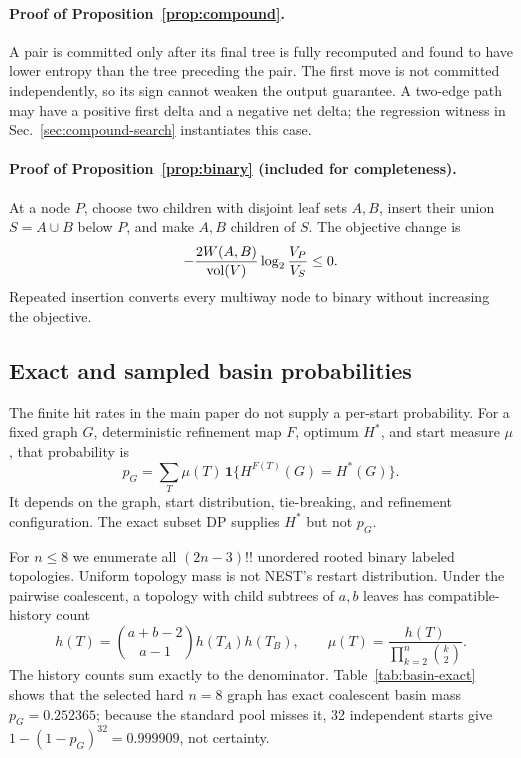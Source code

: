 \paragraph{Proof of Proposition~\ref{prop:compound}.}
A pair is committed only after its final tree is fully recomputed and found to
have lower entropy than the tree preceding the pair. The first move is not
committed independently, so its sign cannot weaken the output guarantee. A
two-edge path may have a positive first delta and a negative net delta; the
regression witness in Sec.~\ref{sec:compound-search} instantiates this case.

\paragraph{Proof of Proposition~\ref{prop:binary} (included for completeness).}
At a node $P$, choose two children with disjoint leaf sets $A,B$, insert their
union $S=A\cup B$ below $P$, and make $A,B$ children of $S$. The objective
change is
\[
 -\frac{2W(A,B)}{\operatorname{vol}(V)}\log_2\frac{V_P}{V_S}\le 0.
\]
Repeated insertion converts every multiway node to binary without increasing
the objective.

\subsection{Exact and sampled basin probabilities}\label{app:basin}
The finite hit rates in the main paper do not supply a per-start probability.
For a fixed graph $G$, deterministic refinement map $F$, optimum $H^*$, and
start measure $\mu$, that probability is
\[
 p_G=\sum_T \mu(T)\,\mathbf{1}\{H^{F(T)}(G)=H^*(G)\}.
\]
It depends on the graph, start distribution, tie-breaking, and refinement
configuration.  The exact subset DP supplies $H^*$ but not $p_G$.

For $n\leq 8$ we enumerate all $(2n-3)!!$ unordered rooted binary labeled
topologies.  Uniform topology mass is not NEST's restart distribution. Under
the pairwise coalescent, a topology with child subtrees of $a,b$ leaves has
compatible-history count
\[
 h(T)=\binom{a+b-2}{a-1}h(T_A)h(T_B),\qquad
 \mu(T)=\frac{h(T)}{\prod_{k=2}^{n}\binom{k}{2}}.
\]
The history counts sum exactly to the denominator. Table~\ref{tab:basin-exact}
shows that the selected hard $n=8$ graph has exact coalescent basin mass
$p_G=0.252365$; because the standard pool misses it, 32 independent starts
give $1-(1-p_G)^{32}=0.999909$, not certainty.



